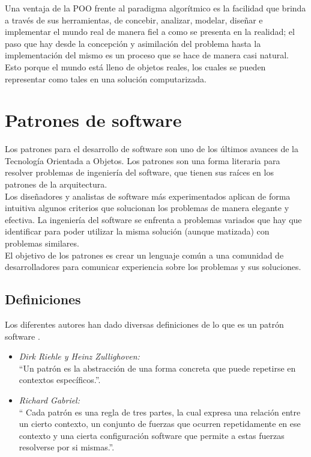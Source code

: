 Una ventaja de la POO frente al paradigma algorítmico es la facilidad que brinda a través de sus herramientas, de concebir, analizar, modelar, diseñar e implementar el mundo real de manera fiel a como se presenta en la realidad; el paso que hay desde la concepción y asimilación del problema hasta la implementación del mismo es un proceso que se hace de manera casi natural. Esto porque el mundo está lleno de objetos reales, los cuales se pueden representar como tales en una solución computarizada.

\section{Patrones de software}
Los patrones para el desarrollo de software son uno de los últimos avances de la Tecnología Orientada a Objetos. Los patrones son una forma literaria para resolver problemas de
ingeniería del software, que tienen sus raíces en los patrones de la arquitectura. \\

Los diseñadores y analistas de software más experimentados aplican de forma intuitiva algunos criterios que solucionan los problemas de manera elegante y efectiva. La ingeniería del
software se enfrenta a problemas variados que hay que identificar para poder utilizar la misma solución (aunque matizada) con problemas similares. \\

El objetivo de los patrones es crear un lenguaje común a una comunidad de desarrolladores para comunicar experiencia sobre los problemas y sus soluciones.

  \subsection{Definiciones}
  Los diferentes autores han dado diversas definiciones de lo que es un patrón software \cite{ref12}.
  \begin{itemize}
  	\item \textit{Dirk Riehle y Heinz Zullighoven:} \\
  	“Un patrón es la abstracción de una forma concreta que puede repetirse en contextos específicos.”.
 	\item \textit{Richard Gabriel:} \\
  	“  Cada patrón es una regla de tres partes, la cual expresa una relación entre un cierto contexto, un conjunto de fuerzas que ocurren repetidamente en ese contexto y una cierta configuración software que permite a estas fuerzas resolverse por si mismas.”.
  \end{itemize}
  
